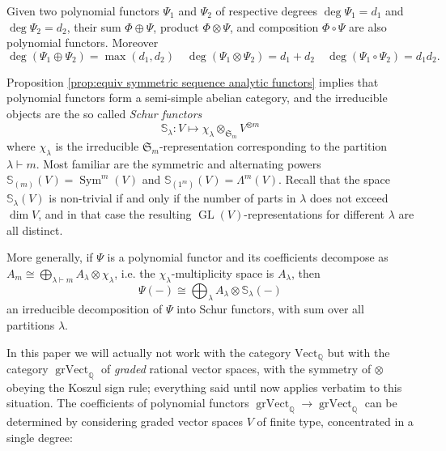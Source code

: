\documentclass[12pt]{article}
\newcommand{\Q}{\mathbb{Q}}
\newcommand{\SymGroup}[1][n]{\mathfrak{S}_{#1}}
\newcommand{\Specht}[1]{\chi_{#1}}
\newcommand{\Schur}[1]{\mathbb{S}_{#1}}
\newcommand{\Vect}[1]{\textrm{Vect}_{#1}}
\DeclareMathOperator{\GL}{GL}
\DeclareMathOperator{\GradedVect}{grVect}
\DeclareMathOperator{\Sym}{Sym}
\theoremstyle{plain}
\theoremstyle{definition}
\theoremstyle{remark}
\begin{document}
Given two polynomial functors $\Psi_1$ and $\Psi_2$ of respective degrees $\deg \Psi_1 = d_1$ and $\deg \Psi_2 = d_2$, their sum $\Phi\oplus\Psi$, product $\Phi\otimes\Psi$, and composition $\Phi\circ\Psi$ are also polynomial functors. Moreover
\begin{equation*}
    \deg (\Psi_1\oplus \Psi_2) = \max (d_1, d_2) \quad
    \deg (\Psi_1\otimes \Psi_2) = d_1+d_2 \quad
    \deg (\Psi_1\circ \Psi_2) = d_1 d_2.
\end{equation*}

Proposition \ref{prop:equiv symmetric sequence analytic functors} implies that polynomial functors form a semi-simple abelian category, and the irreducible objects are the so called \emph{Schur functors}
\begin{equation}\label{eq:defi-Schur-functors}
    \Schur{\lambda}: V \longmapsto \Specht{\lambda} \otimes_{\SymGroup[m]} V^{\otimes m}
\end{equation}
where $\Specht{\lambda}$ is the irreducible $\SymGroup[m]$-representation corresponding to the partition $\lambda\vdash m$. Most familiar are the symmetric and alternating powers $\Schur{(m)}(V) = \Sym^m(V)$ and $\Schur{(1^m)}(V) = \Lambda^m(V)$.
Recall that the space $\Schur{\lambda}(V)$ is non-trivial if and only if the number of parts in $\lambda$ does not exceed $\dim V$, and in that case the resulting $\GL(V)$-representations for different $\lambda$ are all distinct.

More generally, if $\Psi$ is a polynomial functor and its coefficients decompose as $ A_m \cong \bigoplus_{\lambda\vdash m}A_\lambda \otimes\Specht{\lambda}$, i.e. the $\Specht{\lambda}$-multiplicity space is $A_\lambda$, then 
\[
\Psi(-) \cong \bigoplus_{\lambda} A_\lambda\otimes \Schur{\lambda}(-)
\]
an irreducible decomposition of $\Psi$ into Schur functors, with sum over all partitions $\lambda$.

In this paper we will actually not work with the category $\Vect{\Q}$ but with the category $\GradedVect_{\Q}$ of \emph{graded} rational vector spaces, with the symmetry of $\otimes$ obeying the Koszul sign rule; everything said until now applies verbatim to this situation. The coefficients of polynomial functors $\GradedVect_{\Q}\to\GradedVect_{\Q}$ can be determined by considering graded vector spaces $V$ of finite type, concentrated in a single degree:
\end{document}
